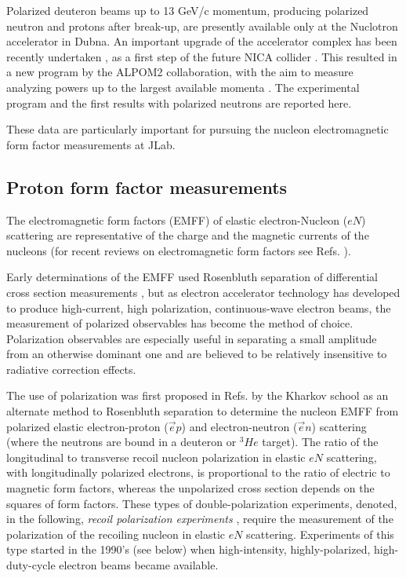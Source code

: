 \documentclass[epj]{svjour}
\begin{document}
Polarized deuteron beams up to 13 GeV/c momentum, producing polarized neutron and protons after break-up, are presently available only  at the Nuclotron accelerator in Dubna. An important upgrade of the accelerator complex has been recently undertaken \cite{Kekelidze:2017ghu}, as a first step of the future NICA collider \cite{Kekelidze:2017ual}.
This resulted in a new program by the ALPOM2 collaboration, with the aim to measure analyzing powers up to the largest available momenta  \cite{ALPOM2}. The experimental program and the first results with polarized neutrons are reported here. 

These data are particularly important for pursuing the nucleon electromagnetic form factor measurements at JLab.

\subsection{Proton form factor measurements}
The electromagnetic form factors (EMFF) of elastic electron-Nucleon ($eN$) scattering are representative of the charge and the magnetic currents of the nucleons (for recent reviews on electromagnetic form factors see Refs. \cite{Pacetti:2015iqa,Punjabi:2015bba}).  
 
Early determinations of the EMFF used Rosenbluth separation of differential cross section measurements  \cite{Pacetti:2015iqa}, but as electron accelerator technology has developed to produce high-current, high polarization, continuous-wave electron beams, the measurement of polarized observables has become the method of choice. Polarization observables are especially useful in separating a small amplitude from an otherwise dominant one and are believed to be relatively insensitive to radiative correction effects. 

The use of polarization was first proposed in Refs. \cite{Akhiezer:1968ek,Akhiezer:1974em} by the Kharkov school as an alternate method to Rosenbluth separation to determine the nucleon EMFF  from  polarized elastic  electron-proton ($\vec e p$) and electron-neutron ($ \vec e n$) scattering (where the neutrons are bound in  a deuteron or $^3\!He$ target). The ratio of the longitudinal to transverse recoil nucleon polarization in elastic $eN$ scattering, with longitudinally polarized electrons, is proportional to the ratio of electric to magnetic form factors, whereas the unpolarized cross section  depends on the squares of form factors. These types of double-polarization experiments,  denoted, in the following, {\it recoil polarization experiments }, require the measurement of the polarization of the recoiling nucleon in elastic $eN$ scattering. Experiments of this type started in the 1990's (see below) when high-intensity, highly-polarized, high-duty-cycle electron beams became available.
\end{document}
